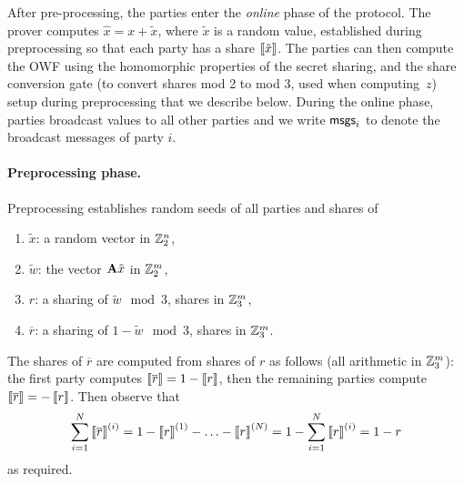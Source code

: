 After pre-processing, the parties enter the \emph{online} phase of the protocol. 
The prover computes $\hat{x}= x + \tilde{x}$, where $\tilde{x}$ is a random value, established during
preprocessing so that each party has a share $\left\llbracket \tilde{x} \right\rrbracket$. 
The parties can then compute the OWF using the homomorphic properties of the secret sharing, 
and the share conversion gate (to convert shares mod 2 to mod 3, used when computing~$z$)
setup during preprocessing that we describe below. 
During the online phase, parties broadcast values to all other parties and we write $\textsf{msgs}_i$
to denote the broadcast messages of party $i$. 


\paragraph{Preprocessing phase.} Preprocessing establishes random seeds of all parties and shares of 
\begin{enumerate}
\item $\tilde{x}$: a random vector in $\mathbb{Z}_2^{n}$,
\item $\tilde{w}$: the vector $\mathbf{A} \tilde{x}$ in $\mathbb{Z}_2^{m}$, 
\item $r$: a sharing of $\tilde{w} \mod 3$, shares in $\mathbb{Z}_3^m$,  
\item $\overline{r}$: a sharing of $1-\tilde{w} \mod 3$, shares in $\mathbb{Z}_3^m$. 
\end{enumerate}
The shares of $\overline{r}$ are computed from shares of $r$ as follows (all arithmetic in $\mathbb{Z}_3^m$): the first
party computes $\left\llbracket \overline{r} \right\rrbracket = 1 - \left\llbracket r \right\rrbracket$, then the remaining parties compute
$\left\llbracket \overline{r} \right\rrbracket = - \left\llbracket r \right\rrbracket$.  Then observe that 
\[\sum_{i=1}^N \left\llbracket \overline{r} \right\rrbracket^{(i)} = 1 - \left\llbracket r \right\rrbracket^{(1)} - \ldots - \left\llbracket r \right\rrbracket^{(N)} = 1 - \sum_{i=1}^{N} \left\llbracket r \right\rrbracket^{(i)} = 1-r \]
 as required. 

